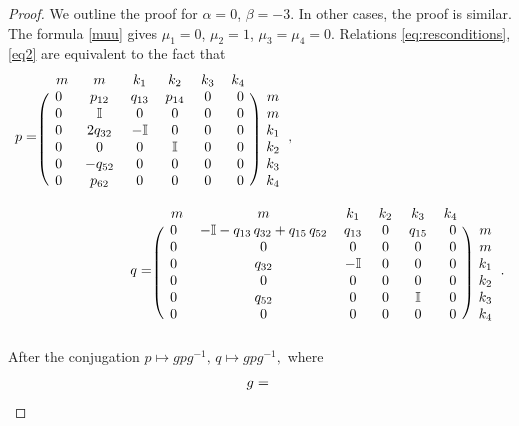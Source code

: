 \documentclass{article}
\theoremstyle{plain}
\begin{document}
\begin{proof} We outline the proof for $\alpha = 0$, $\beta = -3$. In other cases, the proof is similar. 
The formula \eqref{muu} gives $\mu_1 = 0$, $\mu_2 = 1$, $\mu_3 = \mu_4 = 0$. Relations \eqref{eq:resconditions}, \eqref{eq2} are equivalent to the fact that
\begin{equation}
\begin{multlined}
    p
    =
    \begin{blockarray}{ccccccc}
      \,\,\, m & m & k_1 & k_2 & k_3 & k_4 \,\,\, &  \\
    \begin{block}{(cccccc)c}
      0 & p_{12} & q_{13} & p_{14} & 0 & 0 & m  \\
      0 & \mathbb{I} & 0 & 0 & 0 & 0 & m  \\
      0 & 2 q_{32} & - \mathbb{I} & 0 & 0 & 0 & k_1  \\
      0 & 0 & 0 & \mathbb{I} & 0 & 0 & k_2  \\
      0 & - q_{52} & 0 & 0 & 0 & 0 & k_3  \\
      0 & p_{62} & 0 & 0 & 0 & 0 & k_4  \\
    \end{block}
    \end{blockarray},
    \hspace{5cm}
    \\
    q
    =
    \begin{blockarray}{ccccccc}
      \,\,\, m & m & k_1 & k_2 & k_3 & k_4 \,\,\, &  \\
    \begin{block}{(cccccc)c}
      0 & - \mathbb{I} - q_{13} \, q_{32} + q_{15} \, q_{52} & q_{13} & 0 & q_{15} & 0 & m  \\
      0 & 0 & 0 & 0 & 0 & 0 & m  \\
      0 & q_{32} & - \mathbb{I} & 0 & 0 & 0 & k_1  \\
      0 & 0 & 0 & 0 & 0 & 0 & k_2  \\
      0 & q_{52} & 0 & 0 & \mathbb{I} & 0 & k_3  \\
      0 & 0 & 0 & 0 & 0 & 0 & k_4  \\
    \end{block}
    \end{blockarray}.
\end{multlined}
\end{equation}
After the conjugation $p\mapsto g p g^{-1}, \,q\mapsto g p g^{-1},$ where 
$$
    g
    = 
    \begin{blockarray}{ccccccc}

\end{blockarray}$$
\end{proof}
\end{document}
